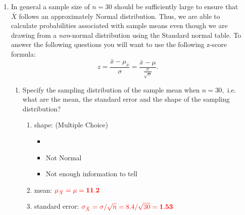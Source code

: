 \begin{enumerate}
\begin{enumerate}
\begin{equation*}
\red{\sigma_{\bar{X}}=\sigma/\sqrt{n}=8.4/\sqrt{5}= \mathbf{3.76} }
\end{equation*}



\item  (\textbf{Yes} or ) Can you find now the probability that the mean return of the five sampled stocks is less than 34 percent? \\


\end{enumerate}

\item In general a sample size of $n=30$ should be sufficiently large to ensure that $\bar{X}$ follows an approximately Normal distribution. Thus, we are able to calculate probabilities associated with sample means even though we are drawing from a  \emph{non}-normal distribution using the Standard normal table. To answer the following questions you will want to use the following z-score formula:
\begin{equation*}
z=\frac{\bar{x}-\mu_{\bar{x}}}{\sigma}=\frac{\bar{x}-\mu}{\frac{\sigma}{\sqrt{n}}}.
\end{equation*}

\begin{enumerate}
	\item Specify the sampling distribution of the sample mean when $n=30,$ i.e. what are the mean, the standard error and the shape of the sampling distribution?\\
	\begin{enumerate}
		\item shape: (Multiple Choice)
		\begin{itemize}
			\item {}
			\item Not Normal
			\item Not enough information to tell
		\end{itemize}
		\item mean: ${\color{red} \mu_{\bar{X}}=\mu=\mathbf{11.2}}$
		
		\item standard error: ${\color{red} \sigma_{\bar{X}}=\sigma/\sqrt{n}=8.4/\sqrt{30}= \mathbf{1.53} }$ \\
		
		
		
	\end{enumerate}














\end{enumerate}
\end{enumerate}
